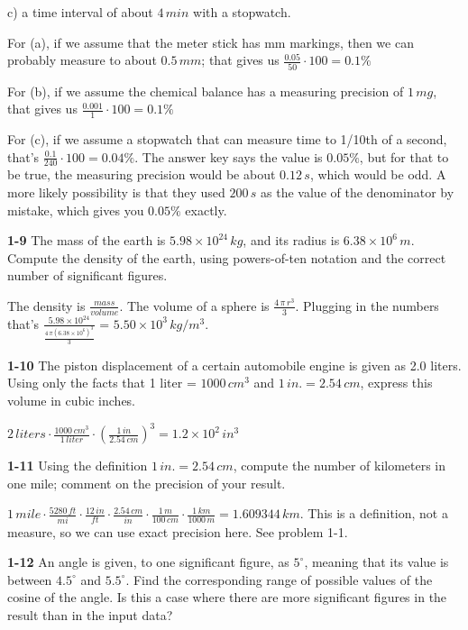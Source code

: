 \documentclass{amsart}
\begin{document}
c) a time interval of about $4\,min$ with a stopwatch.

For (a), if we assume that the meter stick has mm markings,
then we can probably measure to about $0.5\,mm$;
that gives us $\frac{0.05}{50} \cdot 100 = 0.1\%$

For (b), if we assume the chemical balance has a measuring precision of $1\,mg$,
that gives us $\frac{0.001}{1} \cdot 100 = 0.1\%$

For (c), if we assume a stopwatch that can measure time to 1/10th of a second,
that's $\frac{0.1}{240} \cdot 100 = 0.04\%$.
The answer key says the value is $0.05\%$, but for that to be true,
the measuring precision would be about $0.12\,s$, which would be odd.
A more likely possibility is that they used $200\,s$ as the value of the denominator by mistake,
which gives you $0.05\%$ exactly.

\textbf{1-9} The mass of the earth is $5.98 \times 10^{24}\,kg$, and its radius
is $6.38 \times 10^{6}\,m$.  Compute the density of the earth, using powers-of-ten
notation and the correct number of significant figures.

The density is $\frac{mass}{volume}$.  The volume of a sphere is $\frac{4\,\pi\,r^{3}}{3}$.
Plugging in the numbers that's $\frac{5.98 \times 10^{24}}{\frac{4\,\pi(6.38\times 10^{6})^{3}}{3}}$
= $5.50 \times 10^{3}\,kg/m^{3}$.

\textbf{1-10} The piston displacement of a certain automobile engine is given as 2.0 liters.
Using only the facts that 1 liter = $1000\,cm^{3}$ and $1\,in. = 2.54\,cm$, express this volume
in cubic inches.

$2\,liters\cdot\frac{1000\,cm^{3}}{1\,liter}\cdot(\frac{1\,in}{2.54\,cm})^{3} = 1.2\times10^{2}\,in^{3}$

\textbf{1-11} Using the definition $1\,in. = 2.54\,cm$, compute the number of kilometers in one mile;
comment on the precision of your result.

$1\,mile\cdot\frac{5280\,ft}{mi}\cdot\frac{12\,in}{ft}\cdot\frac{2.54\,cm}{in}\cdot\frac{1\,m}{100\,cm}
\cdot\frac{1\,km}{1000\,m} = 1.609344\,km$.
This is a definition, not a measure, so we can use exact precision here.  See problem 1-1.

\textbf{1-12} An angle is given, to one significant figure, as $5^{\circ}$, meaning that its
value is between $4.5^{\circ}$ and $5.5^{\circ}$.
Find the corresponding range of possible values of the cosine of the angle.
Is this a case where there are more significant figures in the result than in the input data?
\end{document}
